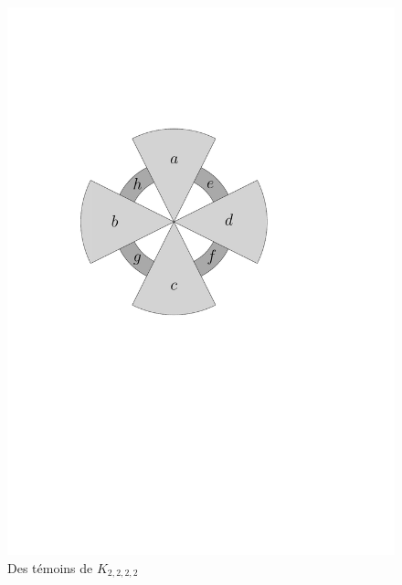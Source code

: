 \documentclass{scrartcl}
\begin{document}
\begin{flushleft}
\begin{figure}[h]
    \caption{Des témoins de $K_{2,2,2,2}$}\label{witnK2222}
    \begin{center}
        \includegraphics[page=\ipeFigfirsttemoinquatriparti, scale = 0.5]{figs}
        \hspace*{2cm}

\end{center}
\end{figure}
\end{flushleft}
\end{document}
